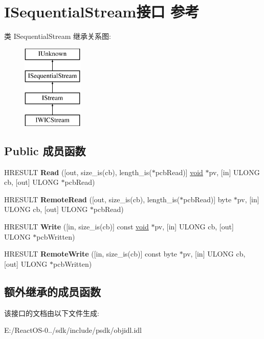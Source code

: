 \hypertarget{interface_i_sequential_stream}{}\section{I\+Sequential\+Stream接口 参考}
\label{interface_i_sequential_stream}
类 I\+Sequential\+Stream 继承关系图\+:\begin{figure}[H]
\begin{center}
\leavevmode
\includegraphics[height=4.000000cm]{interface_i_sequential_stream}
\end{center}
\end{figure}
\subsection*{Public 成员函数}
\begin{DoxyCompactItemize}
\item 
\mbox{\label{interface_i_sequential_stream_ad98b96a50a10a93bb1a836b223b14ee0}} 
H\+R\+E\+S\+U\+LT {\bfseries Read} (\mbox{[}out, size\+\_\+is(cb), length\+\_\+is($\ast$pcb\+Read)\mbox{]} \hyperlink{interfacevoid}{void} $\ast$pv, \mbox{[}in\mbox{]} U\+L\+O\+NG cb, \mbox{[}out\mbox{]} U\+L\+O\+NG $\ast$pcb\+Read)
\item 
\mbox{\label{interface_i_sequential_stream_a1b1a5092724862ed498ff5827d86055f}} 
H\+R\+E\+S\+U\+LT {\bfseries Remote\+Read} (\mbox{[}out, size\+\_\+is(cb), length\+\_\+is($\ast$pcb\+Read)\mbox{]} byte $\ast$pv, \mbox{[}in\mbox{]} U\+L\+O\+NG cb, \mbox{[}out\mbox{]} U\+L\+O\+NG $\ast$pcb\+Read)
\item 
\mbox{\label{interface_i_sequential_stream_a97c7a8dc20f2212f14575ac1e1c3b01a}} 
H\+R\+E\+S\+U\+LT {\bfseries Write} (\mbox{[}in, size\+\_\+is(cb)\mbox{]} const \hyperlink{interfacevoid}{void} $\ast$pv, \mbox{[}in\mbox{]} U\+L\+O\+NG cb, \mbox{[}out\mbox{]} U\+L\+O\+NG $\ast$pcb\+Written)
\item 
\mbox{\label{interface_i_sequential_stream_a69582ff5c825794033f97800d83bf20a}} 
H\+R\+E\+S\+U\+LT {\bfseries Remote\+Write} (\mbox{[}in, size\+\_\+is(cb)\mbox{]} const byte $\ast$pv, \mbox{[}in\mbox{]} U\+L\+O\+NG cb, \mbox{[}out\mbox{]} U\+L\+O\+NG $\ast$pcb\+Written)
\end{DoxyCompactItemize}
\subsection*{额外继承的成员函数}


该接口的文档由以下文件生成\+:\begin{DoxyCompactItemize}
\item 
E\+:/\+React\+O\+S-\/0../sdk/include/psdk/objidl.\+idl\end{DoxyCompactItemize}
